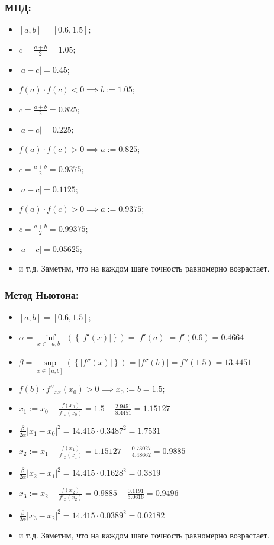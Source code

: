 \subsubsection{МПД:}
\begin{itemize}
    \item $[a, b]=[0.6, 1.5]$;
    \item $c=\frac{a+b}{2}=1.05;$
    \item $|a-c|=\mathbf{0.45}$;
    \item $f(a)\cdot f(c)<0\implies b:=1.05$;
    \item $c=\frac{a+b}{2}=0.825;$
    \item $|a-c|=\mathbf{0.225}$;
    \item $f(a)\cdot f(c)>0\implies a:=0.825$;
    \item $c=\frac{a+b}{2}=0.9375;$
    \item $|a-c|=\mathbf{0.1125}$;
    \item $f(a)\cdot f(c)>0\implies a:=0.9375$;
    \item $c=\frac{a+b}{2}=0.99375;$
    \item $|a-c|=\mathbf{0.05625}$;
    \item и т.д. Заметим, что на каждом шаге точность равномерно возрастает.
\end{itemize}

\subsubsection{Метод Ньютона:}
\begin{itemize}
    \item $[a, b]=[0.6, 1.5]$;
    \item $\alpha = \inf\limits_{x \in [a,b]}(\left\{ |f'(x)|\right\}) = |f'(a)| = f'(0.6) = \mathbf{0.4664}$
    \item $\beta = \sup\limits_{x \in [a,b]}(\left\{ |f''(x)|\right\}) = |f''(b)| = f''(1.5) = \mathbf{13.4451}$
    \item $f(b)\cdot f''_{xx}(x_0) > 0 \implies x_0 := b = 1.5;$
    \item $x_1 := x_0 - \frac{f(x_0)}{f'_x(x_0)} = 1.5 - \frac{2.9451}{8.4451} = 1.15127$
    \item $\frac{\beta}{2\alpha}|x_1-x_0|^2 = 14.415 \cdot 0.3487^2 = \mathbf{1.7531}$
    \item $x_2 := x_1 - \frac{f(x_1)}{f'_x(x_1)} = 1.15127 - \frac{0.73027}{4.48662} = 0.9885$
    \item $\frac{\beta}{2\alpha}|x_2-x_1|^2 = 14.415 \cdot 0.1628^2 = \mathbf{0.3819}$
    \item $x_3 := x_2 - \frac{f(x_2)}{f'_x(x_2)} = 0.9885 - \frac{0.1191}{3.0616} = 0.9496$
    \item $\frac{\beta}{2\alpha}|x_3-x_2|^2 = 14.415 \cdot 0.0389^2 = \mathbf{0.02182}$
    \item и т.д. Заметим, что на каждом шаге точность равномерно возрастает.
\end{itemize}


